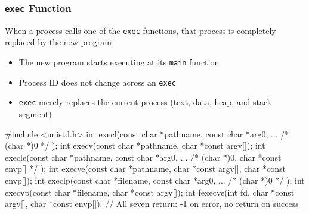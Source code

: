 \documentclass[newPxFont,sthlmFooter,nooffset]{beamer}
\begin{document}
\begin{frame}[containsverbatim,t]
  \frametitle{\texttt{exec} Function}
When a process calls one of the \texttt{exec} functions, that process is completely replaced by the new program
\begin{itemize}
\item The new program starts executing at its \texttt{main} function
\item Process ID does not change across an \texttt{exec}
\item \texttt{exec} merely replaces the current process (text, data, heap, and stack segment)
\end{itemize}


\begin{codedef}
#include <unistd.h>
int execl(const char *pathname, const char *arg0, ... /* (char *)0 */ );
int execv(const char *pathname, char *const argv[]);
int execle(const char *pathname, const char *arg0, ... /* (char *)0, char *const envp[] */ );
int execve(const char *pathname, char *const argv[], char *const envp[]); 
int execlp(const char *filename, const char *arg0, ... /* (char *)0 */ ); 
int execvp(const char *filename, char *const argv[]);
int fexecve(int fd, char *const argv[], char *const envp[]);
// All seven return: -1 on error, no return on success
\end{codedef}
\end{frame}
\end{document}
